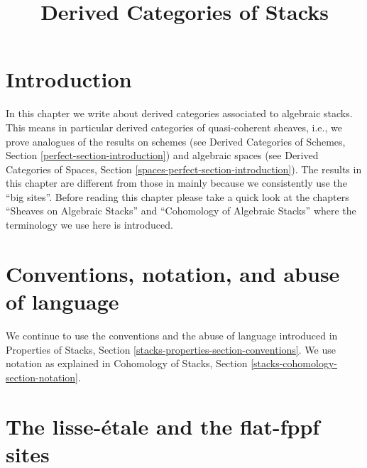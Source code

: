 

%


\title{Derived Categories of Stacks}

\maketitle

\label{section-phantom}

\tableofcontents




\section{Introduction}
\label{section-introduction}

\noindent
In this chapter we write about derived categories associated to
algebraic stacks. This means in particular derived categories
of quasi-coherent sheaves, i.e., we prove analogues of the results
on schemes (see
Derived Categories of Schemes, Section \ref{perfect-section-introduction})
and algebraic spaces (see
Derived Categories of Spaces, Section
\ref{spaces-perfect-section-introduction}). The results in this chapter
are different from those in \cite{LM-B} mainly because we consistently
use the ``big sites''. Before reading this chapter please take a quick
look at the chapters ``Sheaves on Algebraic Stacks'' and
``Cohomology of Algebraic Stacks'' where the terminology we use here is
introduced.



\section{Conventions, notation, and abuse of language}
\label{section-conventions}

\noindent
We continue to use the conventions and the abuse of language
introduced in
Properties of Stacks, Section \ref{stacks-properties-section-conventions}.
We use notation as explained in
Cohomology of Stacks, Section \ref{stacks-cohomology-section-notation}.












\section{The lisse-\'etale and the flat-fppf sites}
\label{section-lisse-etale}

